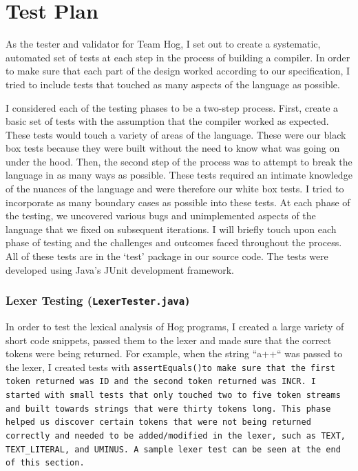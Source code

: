 \documentclass{book}
\begin{document}
\begin{itemize}
\end{itemize}

\chapter{Test Plan}
\label{chap:test}

As the tester and validator for Team Hog, I set out to create a systematic, automated set of tests at each step in the process of building a compiler. In order to make sure that each part of the design worked according to our specification, I tried to include tests that touched as many aspects of the language as possible. 

I considered each of the testing phases to be a two-step process. First, create a basic set of tests with the assumption that the compiler worked as expected. These tests would touch a variety of areas of the language. These were our black box tests because they were built without the need to know what was going on under the hood. Then, the second step of the process was to attempt to break the language in as many ways as possible. These tests required an intimate knowledge of the nuances of the language and were therefore our white box tests. I tried to incorporate as many boundary cases as possible into these tests. At each phase of the testing, we uncovered various bugs and unimplemented aspects of the language that we fixed on subsequent iterations. I will briefly touch upon each phase of testing and the challenges and outcomes faced throughout the process. All of these tests are in the ‘test’ package in our source code. The tests were developed using Java’s JUnit development framework.

\subsection*{Lexer Testing (\tt LexerTester.java\rm)}
 
In order to test the lexical analysis of Hog programs, I created a large variety of short code snippets, passed them to the lexer and made sure that the correct tokens were being returned. For example, when the string ``a++`` was passed to the lexer, I created tests with \tt assertEquals()\rm to make sure that the first token returned was ID and the second token returned was INCR. I started with small tests that only touched two to five token streams and built towards strings that were thirty tokens long. This phase helped us discover certain tokens that were not being returned correctly and needed to be added/modified in the lexer, such as \tt TEXT\rm, \tt TEXT\_LITERAL\rm, and \tt UMINUS\rm. A sample lexer test can be seen at the end of this section.
\end{document}

